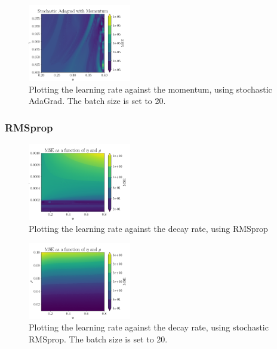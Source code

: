 \documentclass[aps,pra,english,notitlepage,reprint,nofootinbib]{revtex4-1}  %
\begin{document}
\begin{figure}[ht!]
    \centering
    \includegraphics[width = 0.4\textwidth]{../figs/AdagradMomentum_stochastic_eta_gamma.pdf}
    \caption{Plotting the learning rate against the momentum, using stochastic AdaGrad. The batch size is set to 20.}
    \label{fig: AdagradMomentum_stochastic_eta_gamma}
\end{figure}

\subsubsection{RMSprop}
\begin{figure}[ht!]
    \centering
    \includegraphics[width = 0.4\textwidth]{../figs/RMS_Prop_eta_rho.pdf}
    \caption{Plotting the learning rate against the decay rate, using RMSprop}
    \label{fig: RMS_Prop_eta_rho}
\end{figure}

\begin{figure}[ht!]
    \centering
    \includegraphics[width = 0.4\textwidth]{../figs/RMS_Prop_stochastic_eta_rho.pdf}
    \caption{Plotting the learning rate against the decay rate, using stochastic RMSprop. The batch size is set to 20.}
    \label{fig: RMS_Prop_stochastic_eta_rho}
\end{figure}
\end{document}
